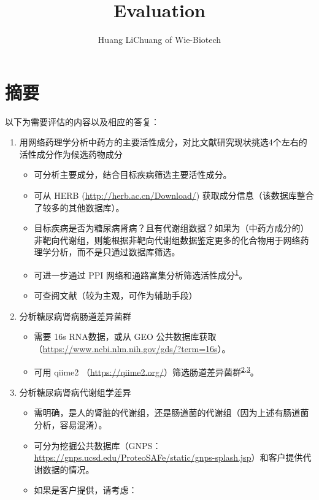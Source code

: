 \documentclass[
]{article}
\title{Evaluation}
\author{Huang LiChuang of Wie-Biotech}
\date{}
\providecommand{\tightlist}{%
  \setlength{\itemsep}{0pt}\setlength{\parskip}{0pt}}
\begin{document}
\maketitle

{
\setcounter{tocdepth}{3}
\tableofcontents
}
\listoffigures

\listoftables

\hypertarget{abstract}{%
\section{摘要}\label{abstract}}

以下为需要评估的内容以及相应的答复：

\begin{enumerate}
\def\labelenumi{\arabic{enumi}.}
\tightlist
\item
  用网络药理学分析中药方的主要活性成分，对比文献研究现状挑选4个左右的活性成分作为候选药物成分

  \begin{itemize}
  \tightlist
  \item
    可分析主要成分，结合目标疾病筛选主要活性成分。
  \item
    可从 HERB (\url{http://herb.ac.cn/Download/}) 获取成分信息（该数据库整合了较多的其他数据库）。
  \item
    目标疾病是否为糖尿病肾病？且有代谢组数据？如果为（中药方成分的）非靶向代谢组，则能根据非靶向代谢组数据鉴定更多的化合物用于网络药理学分析，而不是只通过数据库筛选。
  \item
    可进一步通过 PPI 网络和通路富集分析筛选活性成分\textsuperscript{\protect\hyperlink{ref-NeuronSpecificMurtaz2022}{1}}。
  \item
    可查阅文献（较为主观，可作为辅助手段）
  \end{itemize}
\item
  分析糖尿病肾病肠道差异菌群

  \begin{itemize}
  \tightlist
  \item
    需要 16s RNA数据，或从 GEO 公共数据库获取（\url{https://www.ncbi.nlm.nih.gov/gds/?term=16s}）。
  \item
    可用 qiime2 （\url{https://qiime2.org/}）筛选肠道差异菌群\textsuperscript{\protect\hyperlink{ref-MicrobiomeDataRaiS2021}{2},\protect\hyperlink{ref-LongitudinalInWang2019}{3}}。
  \end{itemize}
\item
  分析糖尿病肾病代谢组学差异

  \begin{itemize}
  \tightlist
  \item
    需明确，是人的肾脏的代谢组，还是肠道菌的代谢组（因为上述有肠道菌分析，容易混淆）。
  \item
    可分为挖掘公共数据库（GNPS：\url{https://gnps.ucsd.edu/ProteoSAFe/static/gnps-splash.jsp}）和客户提供代谢数据的情况。
  \item
    如果是客户提供，请考虑：


\end{itemize}
\end{enumerate}
\end{document}
